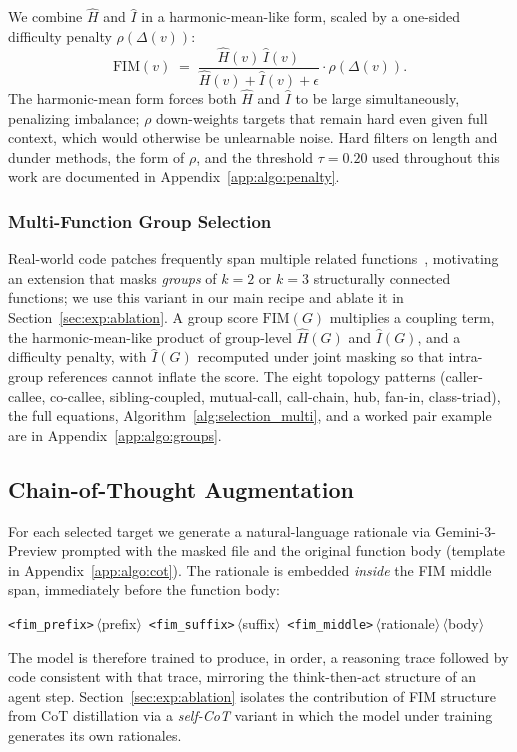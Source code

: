 We combine $\hat{H}$ and $\hat{I}$ in a harmonic-mean-like form, scaled
by a one-sided difficulty penalty $\rho(\Delta(v))$:
\vspace{-0.5ex}
\begin{equation}
  \mathrm{FIM}(v) \;=\;
  \frac{\hat{H}(v)\,\hat{I}(v)}{\hat{H}(v) + \hat{I}(v) + \epsilon}
  \cdot \rho\!\left(\Delta(v)\right).
  \label{eq:fim_single}
\end{equation}
The harmonic-mean form forces both $\hat{H}$ and $\hat{I}$ to be large
simultaneously, penalizing imbalance; $\rho$ down-weights targets that
remain hard even given full context, which would otherwise be
unlearnable noise. Hard filters on length and dunder methods, the form
of $\rho$, and the threshold $\tau\!=\!0.20$ used throughout this work
are documented in Appendix~\ref{app:algo:penalty}.

\subsubsection{Multi-Function Group Selection}
\label{sec:method:groups}

Real-world code patches frequently span multiple related
functions~\citep{swebench}, motivating an extension that masks
\emph{groups} of $k\!=\!2$ or $k\!=\!3$ structurally connected functions;
we use this variant in our main recipe and ablate it in
Section~\ref{sec:exp:ablation}. A group score $\mathrm{FIM}(G)$
multiplies a coupling term, the harmonic-mean-like product of
group-level $\hat{H}(G)$ and $\hat{I}(G)$, and a difficulty penalty,
with $\hat{I}(G)$ recomputed under joint masking so that intra-group
references cannot inflate the score. The eight topology patterns
(caller-callee, co-callee, sibling-coupled, mutual-call, call-chain,
hub, fan-in, class-triad), the full equations,
Algorithm~\ref{alg:selection_multi}, and a worked pair example are in
Appendix~\ref{app:algo:groups}.

\vspace{-0.5ex}
\subsection{Chain-of-Thought Augmentation}
\label{sec:method:cot}

For each selected target we generate a natural-language rationale via
Gemini-3-Preview prompted with the masked file and the original function
body (template in Appendix~\ref{app:algo:cot}). The rationale is
embedded \emph{inside} the FIM middle span, immediately before the
function body:
\vspace{-0.5ex}
\begin{center}\small
\texttt{<fim\_prefix>}\,$\langle$prefix$\rangle$\,%
\texttt{<fim\_suffix>}\,$\langle$suffix$\rangle$\,%
\texttt{<fim\_middle>}\,$\langle$rationale$\rangle$\,$\langle$body$\rangle$
\end{center}
The model is therefore trained to produce, in order, a reasoning trace
followed by code consistent with that trace, mirroring the
think-then-act structure of an agent step. Section~\ref{sec:exp:ablation}
isolates the contribution of FIM structure from CoT distillation via a
\emph{self-CoT} variant in which the model under training generates its
own rationales.
